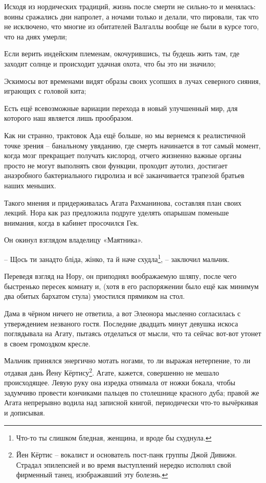 \documentclass[
  a5paperpaper,
  DIV=11,
  numbers=noendperiod]{scrreprt}
\begin{document}
Исходя из нордических традиций, жизнь после смерти не сильно-то и
менялась: воины сражались дни напролет, а ночами только и делали, что
пировали, так что не исключено, что многие из обитателей Валгаллы вообще
не были в курсе того, что на днях умерли;

Если верить индейским племенам, окочурившись, ты будешь жить там, где
заходит солнце и происходит удачная охота, что бы это ни значило;

Эскимосы вот временами видят образы своих усопших в лучах северного
сияния, играющих с головой кита;

Есть ещё всевозможные вариации перехода в новый улучшенный мир, для
которого наш является лишь прообразом.

Как ни странно, трактовок Ада ещё больше, но мы вернемся к реалистичной
точке зрения -- банальному увяданию, где смерть начинается в тот самый
момент, когда мозг прекращает получать кислород, отчего жизненно важные
органы просто не могут выполнять свои функции, проходит аутолиз,
достигает анаэробного бактериального гидролиза и всё заканчивается
трапезой братьев наших меньших.

Такого мнения и придерживалась Агата Рахманинова, составляя план своих
лекций. Нора как раз предложила подруге уделять опарышам поменьше
внимания, когда в кабинет просочился Гек.

Он окинул взглядом владелицу «Маятника».

-- Щось ти занадто бліда, жінко, та й наче схудла\footnote{Что-то ты
  слишком бледная, женщина, и вроде бы схуднула.}, -- заключил мальчик.

Переведя взгляд на Нору, он приподнял воображаемую шляпу, после чего
быстренько пересек комнату и, (хотя в его распоряжении было ещё как
минимум два обитых бархатом стула) умостился прямиком на стол.

Дама в чёрном ничего не ответила, а вот Элеонора мысленно согласилась с
утверждением незваного гостя. Последние двадцать минут девушка искоса
поглядывала на Агату, пытаясь отделаться от мысли, что та сейчас вот-вот
утонет в своем громоздком кресле.

Мальчик принялся энергично мотать ногами, то ли выражая нетерпение, то
ли отдавая дань Йену Кёртису\footnote{Йен Кёртис -- вокалист и
  основатель пост-панк группы Джой Дивижн. Страдал эпилепсией и во время
  выступлений нередко исполнял свой фирменный танец, изображавший эту
  болезнь.}. Агате, кажется, совершенно не мешало происходящее. Левую
руку она изредка отнимала от ножки бокала, чтобы задумчиво провести
кончиками пальцев по столешнице красного дуба; правой же Агата
непрерывно водила над записной книгой, периодически что-то вычёркивая и
дописывая.
\end{document}
